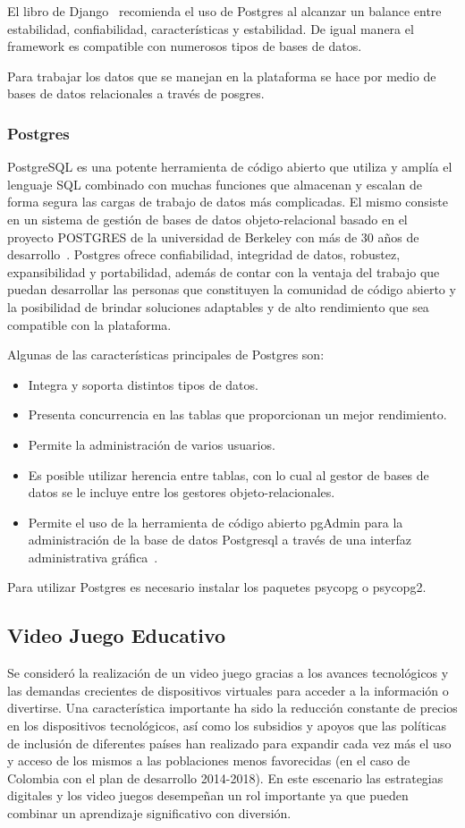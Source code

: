 \documentclass[journal,transmag]{IEEEtran}
\begin{document}
El libro de Django~\cite{DjangoM} recomienda el uso de Postgres al alcanzar un balance entre estabilidad, confiabilidad, características y estabilidad. De igual manera el framework es compatible con numerosos tipos de bases de datos. 

Para trabajar los datos que se manejan en la plataforma se hace por medio de bases de datos relacionales a través de posgres.
\subsubsection{Postgres}
PostgreSQL es una potente herramienta de código abierto que utiliza y amplía el lenguaje SQL combinado con muchas funciones que almacenan y escalan de forma segura las cargas de trabajo de datos más complicadas. El mismo consiste en un sistema de gestión de bases de datos objeto-relacional basado en el proyecto POSTGRES de la universidad de Berkeley con más de 30 años de desarrollo~\cite{Postgres}. Postgres ofrece confiabilidad, integridad de datos, robustez, expansibilidad y portabilidad, además de contar con la ventaja del trabajo que puedan desarrollar las personas que constituyen la comunidad de código abierto y la posibilidad de brindar soluciones adaptables y de alto rendimiento que sea compatible con la plataforma. 

Algunas de las características principales de Postgres son:

\begin{itemize}
\item Integra y soporta distintos tipos de datos.
\item Presenta concurrencia en las tablas que proporcionan un mejor rendimiento.
\item Permite la administración de varios usuarios.
\item Es posible utilizar herencia entre tablas, con lo cual al gestor de bases de datos se le incluye entre los gestores objeto-relacionales.
\item Permite el uso de la herramienta de código abierto pgAdmin para la administración de la base de datos Postgresql a través de una interfaz administrativa gráfica~\cite{Pgadmin}.
\end{itemize}

Para utilizar Postgres es necesario instalar los paquetes psycopg o psycopg2.

\subsection{Video Juego Educativo}\label{videojuego}
Se consideró la realización de un video juego gracias a los avances tecnológicos y las demandas crecientes de dispositivos virtuales para acceder a la información o divertirse. Una característica importante ha sido la reducción constante de precios en los dispositivos tecnológicos, así como los subsidios y apoyos que las políticas de inclusión de diferentes países han realizado para expandir cada vez más el uso y acceso de los mismos a las poblaciones menos favorecidas (en el caso de Colombia con el plan de desarrollo 2014-2018). En este escenario las estrategias digitales y los video juegos desempeñan un rol importante ya que pueden combinar un aprendizaje significativo con diversión.
\end{document}
